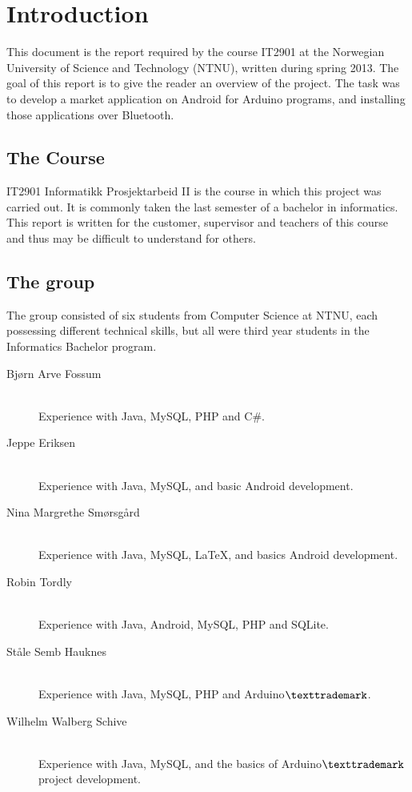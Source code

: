 \chapter{Introduction}

This document is the report required by the course IT2901 at the Norwegian University of Science and Technology (NTNU), written during spring 2013. The goal of this report is to give the reader an overview of the project.
The task was to develop a market application on Android for Arduino programs, and installing those applications over Bluetooth.

\section{The Course}
IT2901 Informatikk Prosjektarbeid II is the course in which this project was carried out. It is commonly taken the last semester of a bachelor in informatics. This report is written for the customer, supervisor and teachers of this course and thus may be difficult to understand for others.

\section{The group}
The group consisted of six students from Computer Science at NTNU, each possessing different technical skills, but all were third year students in the Informatics Bachelor program.

\begin{description}
	\item[Bjørn Arve Fossum]\hfill \\
		Experience with Java, MySQL, PHP and C\#.
	\item[Jeppe Eriksen]\hfill \\
		Experience with Java, MySQL, and basic Android development.
	\item[Nina Margrethe Smørsgård]\hfill \\
		Experience with Java, MySQL, \LaTeX, and basics Android development.
	\item[Robin Tordly]\hfill \\
		Experience with Java, Android, MySQL, PHP and SQLite.
	\item[Ståle Semb Hauknes]\hfill \\
		Experience with Java, MySQL, PHP and Arduino$\texttrademark$.
	\item[Wilhelm Walberg Schive]\hfill \\
		Experience with Java, MySQL, and the basics of Arduino$\texttrademark$ project development.
\end{description}

